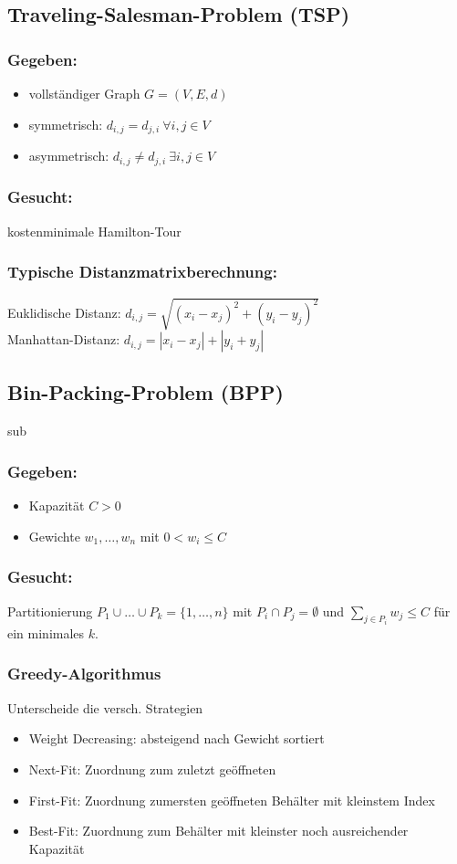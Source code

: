 \documentclass[12pt]{article}
\begin{document}
		\subsection{Traveling-Salesman-Problem (TSP)}\label{TSP}
			\subsubsection*{Gegeben:}
			\begin{itemize}
				\item vollständiger Graph $G=(V,E,d)$
				\item symmetrisch: $d_{i,j}=d_{j,i}\> \forall i,j\in V$
				\item asymmetrisch: $d_{i,j}\neq d_{j,i}\> \exists i,j \in V$
			\end{itemize}
			\subsubsection*{Gesucht:}
			kostenminimale Hamilton-Tour
			
			\subsubsection{Typische Distanzmatrixberechnung:}
			Euklidische Distanz: $d_{i,j}=\sqrt{(x_i-x_j)^2+(y_i-y_j)^2}$ \\
			Manhattan-Distanz: $d_{i,j}=|x_i-x_j|+|y_i+y_j|$
		\subsection{Bin-Packing-Problem (BPP)}
	sub		\subsubsection*{Gegeben:}
				\begin{itemize}
					\item Kapazität $C>0$
					\item Gewichte $w_1,\dots,w_n$ mit $0<w_i\le C$
				\end{itemize}
			\subsubsection*{Gesucht:}
				Partitionierung $P_1\cup\dots\cup P_k = \{1,\dots,n\}$ mit $P_i\cap P_j = \emptyset$ und $\sum_{j\in P_i} w_j \le C$ für ein minimales $k$.

			\subsubsection*{Greedy-Algorithmus}\label{BPGreedy}
			Unterscheide die versch. Strategien
			\begin{itemize}
				\item Weight Decreasing: absteigend nach Gewicht sortiert
				\item Next-Fit: Zuordnung zum zuletzt geöffneten
				\item First-Fit: Zuordnung zumersten geöffneten Behälter mit kleinstem Index
				\item Best-Fit: Zuordnung zum Behälter mit kleinster noch ausreichender Kapazität
			\end{itemize}
		
\end{document}
